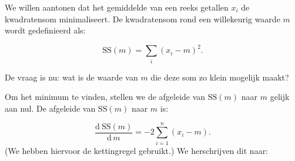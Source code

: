 \documentclass[
  a4paper,
]{scrbook}
\theoremstyle{definition}
\theoremstyle{definition}
\theoremstyle{remark}
\begin{document}
\providecommand*{\angs}{\smash{\mathrm{\ring A}}}
\providecommand*{\celsius}{\mathrm{~\circ C}}
\providecommand*{\micro}{\mu}

\providecommand*{\unit}[1]{\textrm{\,#1}}

\providecommand{\E}{\mathrm{e}}
\providecommand{\I}{\mathrm{i}}
\providecommand{\sfrac}[2]{^{#1}/_{#2}}

\providecommand{\conc}[1]{\left[\mathrm{#1}\right]}

\providecommand{\command}[1]{\textsl{#1}}
\providecommand{\out}[1]{\begin{verbatim}#1\end{verbatim}}

\providecommand{\diff}{\mathrm{d}\,}

\providecommand*{\deriv}[3][]{%
    \frac{\diff^{#1}#2}{\diff #3^{#1}}}
\providecommand*{\pderiv}[3][]{%
    \frac{\partial^{#1}#2}
        {\partial #3^{#1}}}

\renewcommand{\vec}[1]{{\boldsymbol #1}}

\providecommand{\cov}[2]{\mathrm{Cov}\!\left(#1, #2\right)}
\providecommand{\var}[1]{\mathrm{Var}\!\left(#1\right)}

\providecommand{\mean}[1]{\overline{#1}}

\providecommand{\sd}[1]{\sigma\left(#1\right)}
\providecommand{\ev}[1]{\mathbb{E}\!\left(#1\right)}
\providecommand{\pr}[1]{\textrm{Pr}\!\left(#1\right)}

\providecommand{\se}[1]{\mathrm{SE}_{#1}}

\providecommand{\ct}[3]{t_{#1 (#2) #3}}

\providecommand{\HO}{H\ped{0}}
\providecommand{\HA}{H\ped{A}}
\providecommand{\df}{\mathrm{df}}

We willen aantonen dat het gemiddelde van een reeks getallen \(x_i\) de
kwadratensom minimaliseert. De kwadratensom rond een willekeurig waarde
\(m\) wordt gedefinieerd als:

\[
\mathrm{SS}(m) = \sum_i \left(x_i - m\right)^2.
\]

De vraag is nu: wat is de waarde van \(m\) die deze som zo klein
mogelijk maakt?

Om het minimum te vinden, stellen we de afgeleide van \(\mathrm{SS}(m)\)
naar \(m\) gelijk aan nul. De afgeleide van \(\mathrm{SS}(m)\) naar
\(m\) is:

\[
    \frac{\mathrm{d}\,^{}\mathrm{SS}(m)}{\mathrm{d}\,m^{}} = -2 \sum_{i=1}^n \left( x_i - m\right).
\] (We hebben hiervoor de kettingregel gebruikt.) We herschrijven dit
naar:
\end{document}
